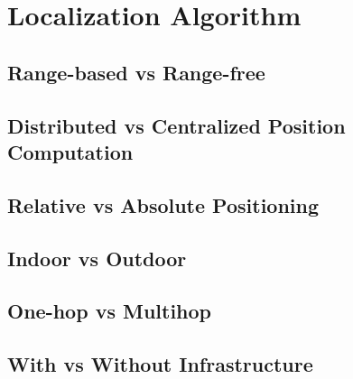 \section{Localization Algorithm} \label{sec:Chapter2-3} 

\subsection{Range-based vs Range-free}

\subsection{Distributed vs Centralized Position Computation}

\subsection{Relative vs Absolute Positioning}

\subsection{Indoor vs Outdoor}

\subsection{One-hop vs Multihop}

\subsection{With vs Without Infrastructure}
